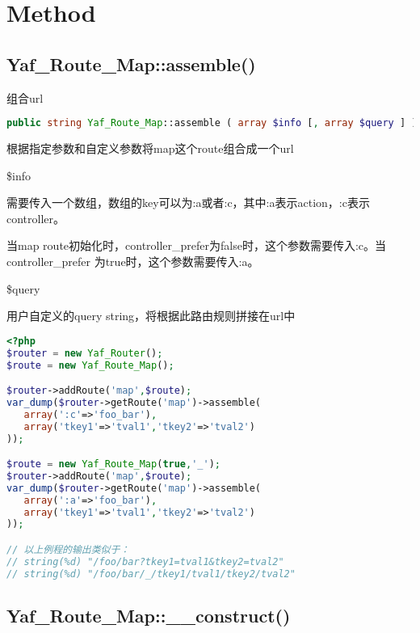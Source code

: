 \section{Method}


\subsection{Yaf\_Route\_Map::assemble()}

组合url

\begin{lstlisting}[language=PHP]
public string Yaf_Route_Map::assemble ( array $info [, array $query ] )
\end{lstlisting}


根据指定参数和自定义参数将map这个route组合成一个url

\begin{compactitem}
\item \$info

需要传入一个数组，数组的key可以为:a或者:c，其中:a表示action，:c表示controller。


当map route初始化时，controller\_prefer为false时，这个参数需要传入:c。当controller\_prefer 为true时，这个参数需要传入:a。

\item \$query

用户自定义的query string，将根据此路由规则拼接在url中

\end{compactitem}

\begin{lstlisting}[language=PHP]
<?php
$router = new Yaf_Router();
$route = new Yaf_Route_Map();

$router->addRoute('map',$route);
var_dump($router->getRoute('map')->assemble(
   array(':c'=>'foo_bar'),
   array('tkey1'=>'tval1','tkey2'=>'tval2')
));

$route = new Yaf_Route_Map(true,'_');
$router->addRoute('map',$route);
var_dump($router->getRoute('map')->assemble(
   array(':a'=>'foo_bar'),
   array('tkey1'=>'tval1','tkey2'=>'tval2')
));

// 以上例程的输出类似于：
// string(%d) "/foo/bar?tkey1=tval1&tkey2=tval2"
// string(%d) "/foo/bar/_/tkey1/tval1/tkey2/tval2"
\end{lstlisting}



\subsection{Yaf\_Route\_Map::\_\_construct()}


